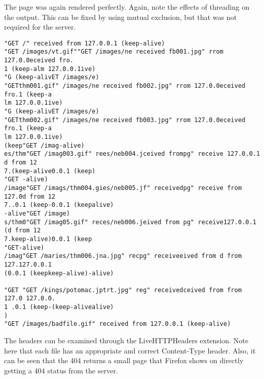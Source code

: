 \documentclass[11pt]{report}
\begin{document}
The page was again rendered perfectly. Again, note the effects of threading on the output. This can be fixed by using mutual exclusion, but that was not required for the server.

\begin{verbatim}
"GET /" received from 127.0.0.1 (keep-alive)
"GET /images/vt.gif""GET /images/ne received fb001.jpg" rrom 127.0.0eceived fro.
1 (keep-alm 127.0.0.1ive)
"G (keep-alivET /images/e)
"GETthm001.gif" /images/ne received fb002.jpg" rrom 127.0.0eceived fro.1 (keep-a
lm 127.0.0.1ive)
"G (keep-alivET /images/e)
"GETthm002.gif" /images/ne received fb003.jpg" rrom 127.0.0eceived fro.1 (keep-a
lm 127.0.0.1ive)
(keep"GET /imag-alive)
es/thm"GET /imag003.gif" rees/neb004.jceived frompg" receive 127.0.0.1 d from 12
7.(keep-alive0.0.1 (keep)
"GET -alive)
/image"GET /imags/thm004.gies/neb005.jf" receivedpg" receive from 127.0d from 12
7..0.1 (keep-0.0.1 (keepalive)
-alive"GET /image)
s/thm0"GET /imag05.gif" reces/neb006.jeived from pg" receive127.0.0.1 (d from 12
7.keep-alive)0.0.1 (keep
"GET-alive)
/imag"GET /maries/thm006.jna.jpg" recpg" receiveeived from d from 127.127.0.0.1
(0.0.1 (keepkeep-alive)-alive)

"GET "GET /kings/potomac.jptrt.jpg" reg" receivedceived from from 127.0 127.0.0.
1 .0.1 (keep-(keep-alivealive)
)
"GET /images/badfile.gif" received from 127.0.0.1 (keep-alive)
\end{verbatim}

The headers can be examined through the LiveHTTPHeaders extension. Note here that each file has an appropriate and correct Content-Type header. Also, it can be seen that the 404 returns a small page that Firefox shows on directly getting a 404 status from the server.
\end{document}
